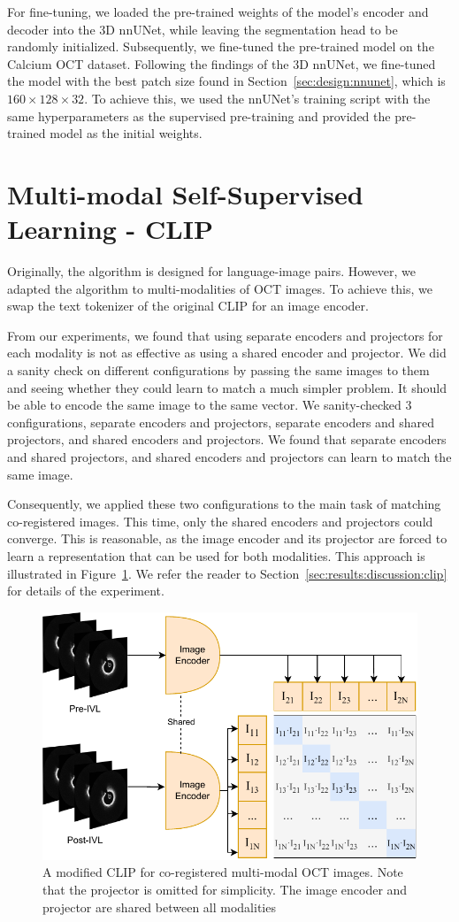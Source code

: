 \documentclass[a4paper,11pt,oneside]{report}
\begin{document}
For fine-tuning, we loaded the pre-trained weights of the model's encoder and decoder into the 3D nnUNet, while leaving the segmentation head to be randomly initialized. Subsequently, we fine-tuned the pre-trained model on the Calcium OCT dataset. Following the findings of the 3D nnUNet, we fine-tuned the model with the best patch size found in Section~\ref{sec:design:nnunet}, which is $160\times 128\times 32$. To achieve this, we used the nnUNet's training script with the same hyperparameters as the supervised pre-training and provided the pre-trained model as the initial weights.

\section{Multi-modal Self-Supervised Learning - CLIP}\label{sec:implementation:clip}
Originally, the algorithm is designed for language-image pairs. However, we adapted the algorithm to multi-modalities of OCT images. To achieve this, we swap the text tokenizer of the original CLIP for an image encoder. 

From our experiments, we found that using separate encoders and projectors for each modality is not as effective as using a shared encoder and projector. We did a sanity check on different configurations by passing the same images to them and seeing whether they could learn to match a much simpler problem. It should be able to encode the same image to the same vector. We sanity-checked 3 configurations, separate encoders and projectors, separate encoders and shared projectors, and shared encoders and projectors. We found that separate encoders and shared projectors, and shared encoders and projectors can learn to match the same image.

Consequently, we applied these two configurations to the main task of matching co-registered images. This time, only the shared encoders and projectors could converge. This is reasonable, as the image encoder and its projector are forced to learn a representation that can be used for both modalities. This approach is illustrated in Figure~\ref{fig:clip-oct}. We refer the reader to Section~\ref{sec:results:discussion:clip} for details of the experiment.

\begin{figure}[hb]
    \centering
    \includegraphics[width=0.65\linewidth]{figures/fig_implementation_clip_oct.pdf}
    \caption{A modified CLIP for co-registered multi-modal OCT images. Note that the projector is omitted for simplicity. The image encoder and projector are shared between all modalities}
    \label{fig:clip-oct}
\end{figure}
\end{document}
